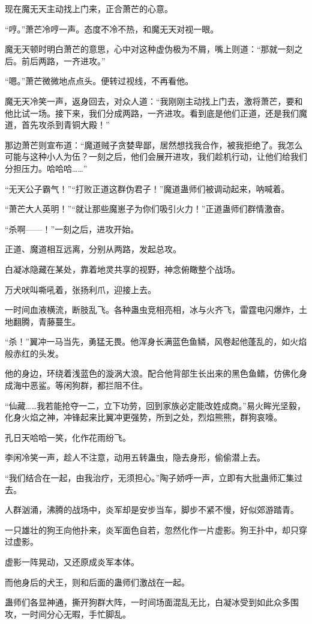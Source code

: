 \begin{this_body}
现在魔无天主动找上门来，正合萧芒的心意。

“哼。”萧芒冷哼一声。态度不冷不热，和魔无天对视一眼。

魔无天顿时明白萧芒的意思，心中对这种虚伪极为不屑，嘴上则道：“那就一刻之后。前后两路，一齐进攻。”

“嗯。”萧芒微微地点点头。便转过视线，不再看他。

魔无天冷笑一声，返身回去，对众人道：“我刚刚主动找上门去，激将萧芒，要和他比试一场。接下来，我们分成两路，一齐进攻。看到底是他们正道，还是我们魔道，首先攻杀到青铜大殿！”

那边萧芒则宣布道：“魔道贼子贪婪卑鄙，居然想找我合作，被我拒绝了。我怎么可能与这种小人为伍？一刻之后，他们会展开进攻，我们趁机行动，让他们给我们分担压力。哈哈哈……”

“无天公子霸气！”“打败正道这群伪君子！”魔道蛊师们被调动起来，呐喊着。

“萧芒大人英明！”“就让那些魔崽子为你们吸引火力！”正道蛊师们群情激奋。

“杀啊——！”一刻之后，进攻开始。

正道、魔道相互远离，分别从两路，发起总攻。

白凝冰隐藏在某处，靠着地灵共享的视野，神念俯瞰整个战场。

万犬吠叫嘶吼着，张扬利爪，迎接上去。

一时间血液横流，断肢乱飞。各种蛊虫竞相亮相，冰与火齐飞，雷霆电闪爆炸，土地翻腾，青藤蔓生。

“杀！”翼冲一马当先，勇猛无畏。他浑身长满蓝色鱼鳞，风卷起他蓬乱的，如火焰般赤红的头发。

他的身边，环绕着浅蓝色的漩涡大浪。配合他背部生长出来的黑色鱼鳍，仿佛化身成海中恶鲨。等闲狗群，都拦阻不住。

“仙藏……我若能抢夺一二，立下功劳，回到家族必定能改姓成商。”易火眸光坚毅，化身火焰之神，冲锋起来比翼冲更强势，所到之处，烈焰熊熊，群狗哀嚎。

孔日天哈哈一笑，化作花雨纷飞。

李闲冷笑一声，趁人不注意，动用五转蛊虫，隐去身形，偷偷潜上去。

“我们结合在一起，由我治疗，无须担心。”陶子娇呼一声，立即有大批蛊师汇集过去。

人群汹涌，沸腾的战场中，炎军却是安步当车，脚步不紧不慢，好似郊游踏青。

一只雄壮的狗王向他扑来，炎军面色自若，忽然化作一片虚影。狗王扑中，却只穿过虚影。

虚影一阵晃动，又还原成炎军本体。

而他身后的犬王，则和后面的蛊师们激战在一起。

蛊师们各显神通，撕开狗群大阵，一时间场面混乱无比，白凝冰受到如此众多围攻，一时间分心无暇，手忙脚乱。

\end{this_body}

